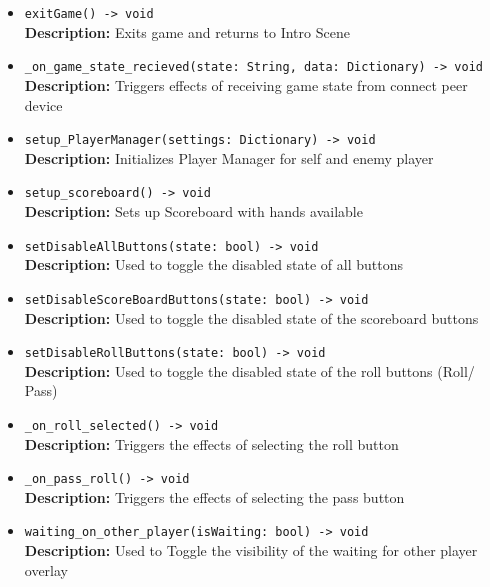 \documentclass[12pt, titlepage]{article}
\begin{document}
\begin{itemize}
    \item \texttt{exitGame() -> void}\\
    \textbf{Description:} Exits game and returns to Intro Scene
    
    \item \texttt{\_on\_game\_state\_recieved(state: String, data: Dictionary) -> void}\\
    \textbf{Description:} Triggers effects of receiving game state from connect peer device
    
    \item \texttt{setup\_PlayerManager(settings: Dictionary) -> void}\\
    \textbf{Description:} Initializes Player Manager for self and enemy player
    
    \item \texttt{setup\_scoreboard() -> void}\\
    \textbf{Description:} Sets up Scoreboard with hands available
    
    \item \texttt{setDisableAllButtons(state: bool) -> void}\\
    \textbf{Description:} Used to toggle the disabled state of all buttons
    
    \item \texttt{setDisableScoreBoardButtons(state: bool) -> void}\\
    \textbf{Description:} Used to toggle the disabled state of the scoreboard buttons
    
    \item \texttt{setDisableRollButtons(state: bool) -> void}\\
    \textbf{Description:} Used to toggle the disabled state of the roll buttons (Roll/ Pass)
    
    \item \texttt{\_on\_roll\_selected() -> void}\\
    \textbf{Description:} Triggers the effects of selecting the roll button
    
    \item \texttt{\_on\_pass\_roll() -> void}\\
    \textbf{Description:} Triggers the effects of selecting the pass button
    
    \item \texttt{waiting\_on\_other\_player(isWaiting: bool) -> void}\\
    \textbf{Description:} Used to Toggle the visibility of the waiting for other player overlay
    

\end{itemize}
\end{document}
